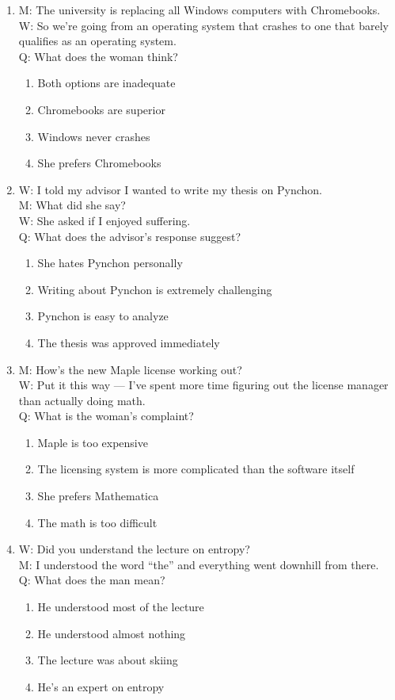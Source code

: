 \documentclass[10pt,a4paper]{article}
\begin{document}
\begin{enumerate}[label=\textbf{\arabic*.}, leftmargin=*]
\item M: The university is replacing all Windows computers with
Chromebooks.\\
W: So we're going from an operating system that crashes to one that
barely qualifies as an operating system.\\
Q: What does the woman think?
\begin{enumerate}[label=(\Alph*)]
\item Both options are inadequate
\item Chromebooks are superior
\item Windows never crashes
\item She prefers Chromebooks
\end{enumerate}

\item W: I told my advisor I wanted to write my thesis on Pynchon.\\
M: What did she say?\\
W: She asked if I enjoyed suffering.\\
Q: What does the advisor's response suggest?
\begin{enumerate}[label=(\Alph*)]
\item She hates Pynchon personally
\item Writing about Pynchon is extremely challenging
\item Pynchon is easy to analyze
\item The thesis was approved immediately
\end{enumerate}

\item M: How's the new Maple license working out?\\
W: Put it this way --- I've spent more time figuring out the
license manager than actually doing math.\\
Q: What is the woman's complaint?
\begin{enumerate}[label=(\Alph*)]
\item Maple is too expensive
\item The licensing system is more complicated than the software itself
\item She prefers Mathematica
\item The math is too difficult
\end{enumerate}

\item W: Did you understand the lecture on entropy?\\
M: I understood the word ``the'' and everything went downhill from
there.\\
Q: What does the man mean?
\begin{enumerate}[label=(\Alph*)]
\item He understood most of the lecture
\item He understood almost nothing
\item The lecture was about skiing
\item He's an expert on entropy
\end{enumerate}


\end{enumerate}
\end{document}
